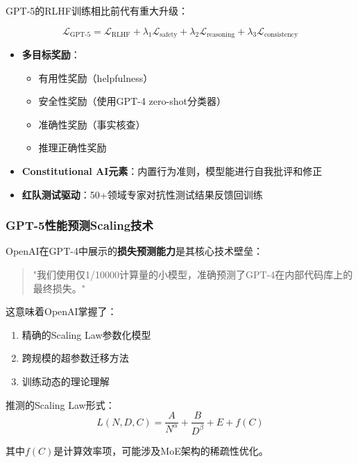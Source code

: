 \documentclass[12pt,a4paper]{article}
\begin{document}
GPT-5的RLHF训练相比前代有重大升级：

\begin{equation}
\mathcal{L}_{\text{GPT-5}} = \mathcal{L}_{\text{RLHF}} + \lambda_1 \mathcal{L}_{\text{safety}} + \lambda_2 \mathcal{L}_{\text{reasoning}} + \lambda_3 \mathcal{L}_{\text{consistency}}
\end{equation}

\begin{itemize}
    \item \textbf{多目标奖励}：
    \begin{itemize}
        \item 有用性奖励（helpfulness）
        \item 安全性奖励（使用GPT-4 zero-shot分类器）
        \item 准确性奖励（事实核查）
        \item 推理正确性奖励
    \end{itemize}
    \item \textbf{Constitutional AI元素}：内置行为准则，模型能进行自我批评和修正
    \item \textbf{红队测试驱动}：50+领域专家对抗性测试结果反馈回训练
\end{itemize}

\subsubsection{GPT-5性能预测Scaling技术}

OpenAI在GPT-4中展示的\textbf{损失预测能力}是其核心技术壁垒：

\begin{quote}
"我们使用仅1/10000计算量的小模型，准确预测了GPT-4在内部代码库上的最终损失。"
\end{quote}

这意味着OpenAI掌握了：
\begin{enumerate}
    \item 精确的Scaling Law参数化模型
    \item 跨规模的超参数迁移方法
    \item 训练动态的理论理解
\end{enumerate}

推测的Scaling Law形式：
\begin{equation}
L(N, D, C) = \frac{A}{N^\alpha} + \frac{B}{D^\beta} + E + f(C)
\end{equation}

其中$f(C)$是计算效率项，可能涉及MoE架构的稀疏性优化。
\end{document}
